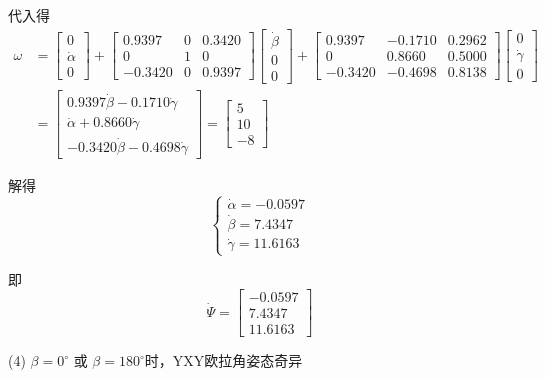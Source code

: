 \documentclass[UTF8, 13pt]{ctexart}
\begin{document}
代入得
\[
\begin{aligned}
    \omega &=
        \begin{bmatrix}
            0 \\ \dot{\alpha} \\ 0
        \end{bmatrix}
        +
        \begin{bmatrix}
            0.9397 & 0 & 0.3420 \\
            0 & 1 & 0 \\
            -0.3420 & 0 & 0.9397
        \end{bmatrix}
        \begin{bmatrix}
            \dot{\beta} \\ 0 \\ 0
        \end{bmatrix}
        +
        \begin{bmatrix}
            0.9397 & -0.1710 & 0.2962 \\
            0 & 0.8660 & 0.5000 \\
            -0.3420 & -0.4698 & 0.8138
        \end{bmatrix}
        \begin{bmatrix}
            0 \\ \dot{\gamma} \\ 0
        \end{bmatrix} \\
        &= 
        \begin{bmatrix}
            0.9397\dot{\beta} - 0.1710\dot{\gamma} \\
            \dot{\alpha} + 0.8660\dot{\gamma} \\
            -0.3420\dot{\beta} - 0.4698\dot{\gamma}
        \end{bmatrix}
        = \begin{bmatrix}
            5 \\ 10 \\ -8
        \end{bmatrix}
\end{aligned}
\]

解得
\[
\begin{cases}
    \dot{\alpha} = -0.0597 \\
    \dot{\beta} = 7.4347 \\
    \dot{\gamma} = 11.6163
\end{cases}
\]

即
\[
\dot{\Psi} = \begin{bmatrix}
    -0.0597 \\ 7.4347 \\ 11.6163
\end{bmatrix}
\]

(4)
\(\beta = 0^\circ \) 或 \(\beta = 180^\circ\)时，YXY欧拉角姿态奇异
\end{document}
